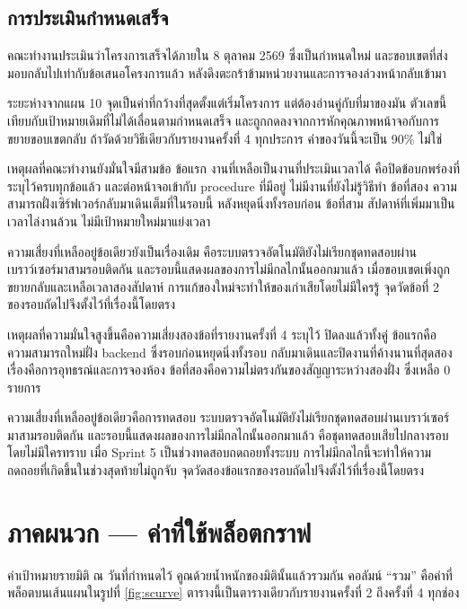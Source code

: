 \subsection{การประเมินกำหนดเสร็จ}

คณะทำงานประเมินว่าโครงการเสร็จได้ภายใน 8 ตุลาคม 2569 ซึ่งเป็นกำหนดใหม่ และขอบเขตที่ส่งมอบกลับไปเท่ากับข้อเสนอโครงการแล้ว หลังดึงตะกร้าข้ามหน่วยงานและการจองล่วงหน้ากลับเข้ามา

ระยะห่างจากแผน 10 จุดเป็นค่าที่กว้างที่สุดตั้งแต่เริ่มโครงการ แต่ต้องอ่านคู่กับที่มาของมัน ตัวเลขนี้เทียบกับเป้าหมายเดิมที่ไม่ได้เลื่อนตามกำหนดเสร็จ และถูกกดลงจากการหักคุณภาพหน้าจอกับการขยายขอบเขตกลับ ถ้าวัดด้วยวิธีเดียวกับรายงานครั้งที่ 4 ทุกประการ ค่าของวันนี้จะเป็น 90\% ไม่ใช่ \actualpct

เหตุผลที่คณะทำงานยังมั่นใจมีสามข้อ ข้อแรก งานที่เหลือเป็นงานที่ประเมินเวลาได้ คือปิดข้อบกพร่องที่ระบุไว้ครบทุกข้อแล้ว และต่อหน้าจอเข้ากับ procedure ที่มีอยู่ ไม่มีงานที่ยังไม่รู้วิธีทำ ข้อที่สอง ความสามารถฝั่งเซิร์ฟเวอร์กลับมาเดินเต็มที่ในรอบนี้ หลังหยุดนิ่งทั้งรอบก่อน ข้อที่สาม สัปดาห์ที่เพิ่มมาเป็นเวลาไล่งานล้วน ไม่มีเป้าหมายใหม่มาแย่งเวลา

ความเสี่ยงที่เหลืออยู่ข้อเดียวยังเป็นเรื่องเดิม คือระบบตรวจอัตโนมัติยังไม่เรียกชุดทดสอบผ่านเบราว์เซอร์มาสามรอบติดกัน และรอบนี้แสดงผลของการไม่มีกลไกนั้นออกมาแล้ว เมื่อขอบเขตเพิ่งถูกขยายกลับและเหลือเวลาสองสัปดาห์ การแก้ของใหม่จะทำให้ของเก่าเสียโดยไม่มีใครรู้ จุดวัดข้อที่ 2 ของรอบถัดไปจึงตั้งไว้ที่เรื่องนี้โดยตรง

เหตุผลที่ความมั่นใจสูงขึ้นคือความเสี่ยงสองข้อที่รายงานครั้งที่ 4 ระบุไว้ ปิดลงแล้วทั้งคู่ ข้อแรกคือความสามารถใหม่ฝั่ง backend ซึ่งรอบก่อนหยุดนิ่งทั้งรอบ กลับมาเดินและปิดงานที่ค้างนานที่สุดสองเรื่องคือการอุทธรณ์และการจองห้อง ข้อที่สองคือความไม่ตรงกันของสัญญาระหว่างสองฝั่ง ซึ่งเหลือ 0 รายการ

ความเสี่ยงที่เหลืออยู่ข้อเดียวคือการทดสอบ ระบบตรวจอัตโนมัติยังไม่เรียกชุดทดสอบผ่านเบราว์เซอร์มาสามรอบติดกัน และรอบนี้แสดงผลของการไม่มีกลไกนั้นออกมาแล้ว คือชุดทดสอบเสียไปกลางรอบโดยไม่มีใครทราบ เมื่อ Sprint 5 เป็นช่วงทดสอบถดถอยทั้งระบบ การไม่มีกลไกนี้จะทำให้ความถดถอยที่เกิดขึ้นในช่วงสุดท้ายไม่ถูกจับ จุดวัดสองข้อแรกของรอบถัดไปจึงตั้งไว้ที่เรื่องนี้โดยตรง

\clearpage
\section*{ภาคผนวก — ค่าที่ใช้พล็อตกราฟ}

ค่าเป้าหมายรายมิติ ณ วันที่กำหนดไว้ คูณด้วยน้ำหนักของมิตินั้นแล้วรวมกัน คอลัมน์ ``รวม'' คือค่าที่พล็อตบนเส้นแผนในรูปที่ \ref{fig:scurve} ตารางนี้เป็นตารางเดียวกับรายงานครั้งที่ 2 ถึงครั้งที่ 4 ทุกช่อง

